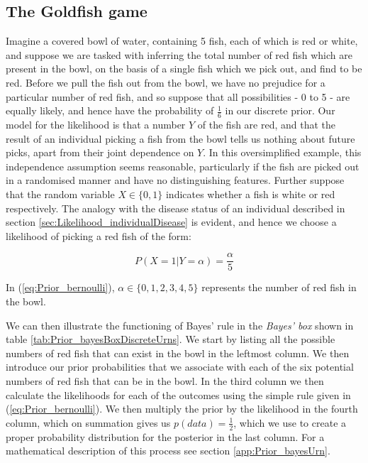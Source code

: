 \documentclass[11pt,fullpage]{book}
\begin{document}
\subsection{The Goldfish game}\label{sec:Prior_urn}
Imagine a covered bowl of water, containing 5 fish, each of which is red or white, and suppose we are tasked with inferring the total number of red fish which are present in the bowl, on the basis of a single fish which we pick out, and find to be red. Before we pull the fish out from the bowl, we have no prejudice for a particular number of red fish, and so suppose that all possibilities - 0 to 5 - are equally likely, and hence have the probability of $\frac{1}{6}$ in our discrete prior. Our model for the likelihood is that a number $Y$ of the fish are red, and that the result of an individual picking a fish from the bowl tells us nothing about future picks, apart from their joint dependence on $Y$. In this oversimplified example, this independence assumption seems reasonable, particularly if the fish are picked out in a randomised manner and have no distinguishing features. Further suppose that the random variable $X\in\{0,1\}$ indicates whether a fish is white or red respectively.  The analogy with the disease status of an individual described in section \ref{sec:Likelihood_individualDisease} is evident, and hence we choose a likelihood of picking a red fish of the form:

\begin{equation}\label{eq:Prior_bernoulli}
P(X = 1|Y=\alpha) = \frac{\alpha}{5}
\end{equation}

In (\ref{eq:Prior_bernoulli}), $\alpha\in\{0,1,2,3,4,5\}$ represents the number of red fish in the bowl.

We can then illustrate the functioning of Bayes' rule in the \textit{Bayes' box} shown in table \ref{tab:Prior_bayesBoxDiscreteUrns}. We start by listing all the possible numbers of red fish that can exist in the bowl in the leftmost column. We then introduce our prior probabilities that we associate with each of the six potential numbers of red fish that can be in the bowl. In the third column we then calculate the likelihoods for each of the outcomes using the simple rule given in (\ref{eq:Prior_bernoulli}). We then multiply the prior by the likelihood in the fourth column, which on summation gives us $p(data)=\frac{1}{2}$, which we use to create a proper probability distribution for the posterior in the last column. For a mathematical description of this process see section \ref{app:Prior_bayesUrn}.
\end{document}
